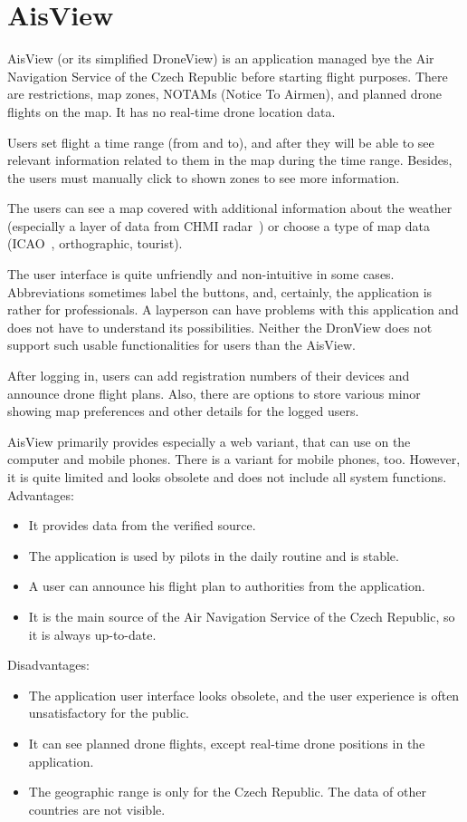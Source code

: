 \section{AisView}\label{sec:aisview}
AisView (or its simplified DroneView) is an application managed bye the Air Navigation Service of the Czech Republic before starting flight purposes.
There are restrictions, map zones, NOTAMs (Notice To Airmen), and planned drone flights on the map.
It has no real-time drone location data.

Users set flight a time range (from and to), and after they will be able to see relevant information related to them in the map during the time range.
Besides, the users must manually click to shown zones to see more information.

The users can see a map covered with additional information about the weather (especially a layer of data from CHMI radar~\cite{chmi}) or choose a type of map data (ICAO~\cite{icao}, orthographic, tourist).

The user interface is quite unfriendly and non-intuitive in some cases.
Abbreviations sometimes label the buttons, and, certainly, the application is rather for professionals.
A layperson can have problems with this application and does not have to understand its possibilities.
Neither the DronView does not support such usable functionalities for users than the AisView.

After logging in, users can add registration numbers of their devices and announce drone flight plans.
Also, there are options to store various minor showing map preferences and other details for the logged users.

AisView primarily provides especially a web variant, that can use on the computer and mobile phones.
There is a variant for mobile phones, too.
However, it is quite limited and looks obsolete and does not include all system functions.
\newline
\newline
Advantages:
\begin{itemize}
    \item It provides data from the verified source.
    \item The application is used by pilots in the daily routine and is stable.
    \item A user can announce his flight plan to authorities from the application.
    \item It is the main source of the Air Navigation Service of the Czech Republic, so it is always up-to-date.
\end{itemize}
Disadvantages:
\begin{itemize}
    \item The application user interface looks obsolete, and the user experience is often unsatisfactory for the public.
    \item It can see planned drone flights, except real-time drone positions in the application.
    \item The geographic range is only for the Czech Republic.
    The data of other countries are not visible.
\end{itemize}
